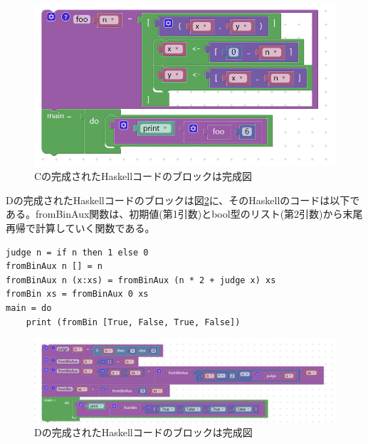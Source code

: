 \documentclass{risepaper}
\begin{document}
\begin{itemize}
\begin{figure}[h]
\begin{center}
\includegraphics[scale=0.5]{img/haskell_experiment_result_c.PNG}
\caption{Cの完成されたHaskellコードのブロックは完成図}%
\label{fig:haskell_experiment_result_c}
\end{center}%
\end{figure}%

Dの完成されたHaskellコードのブロックは図\ref{fig:haskell_experiment_result_d}に、そのHaskellのコードは以下である。fromBinAux関数は、初期値(第1引数)とbool型のリスト(第2引数)から末尾再帰で計算していく関数である。

\begin{lstlisting}[basicstyle=\ttfamily\footnotesize]
judge n = if n then 1 else 0
fromBinAux n [] = n
fromBinAux n (x:xs) = fromBinAux (n * 2 + judge x) xs
fromBin xs = fromBinAux 0 xs
main = do
    print (fromBin [True, False, True, False])
\end{lstlisting}

\begin{figure}[h]
\begin{center}
\includegraphics[scale=0.5]{img/haskell_experiment_result_d.PNG}
\caption{Dの完成されたHaskellコードのブロックは完成図}%
\label{fig:haskell_experiment_result_d}
\end{center}%
\end{figure}%

\end{itemize} 
\end{document}
